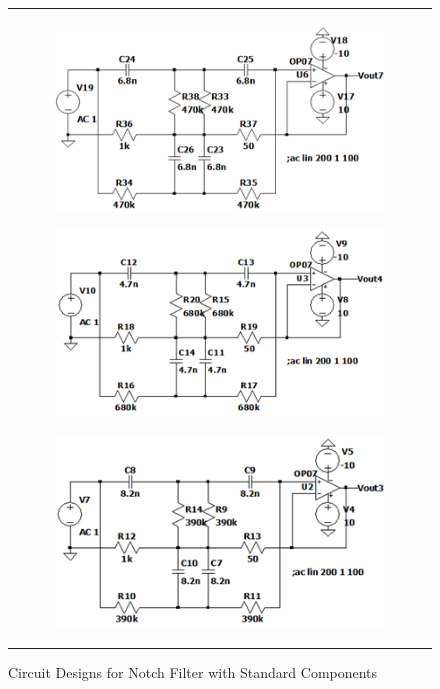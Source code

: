 \documentclass[hidelinks,12pt]{article}
\begin{document}
	\begin{figure}[!h]
		\centering
			\begin{tabular}{c}
				\begin{subfigure}[t]{0.33\textwidth}
					\centering
					\includegraphics[width=\textwidth]{figures/Notch Filter Design/design_1}
					\caption{}
				\end{subfigure}
				\hfill
				\begin{subfigure}[t]{0.33\textwidth}
					\centering
					\includegraphics[width=\textwidth]{figures/Notch Filter Design/design_2}
					\caption{}
					\label{fig:chosen_circuit}
				\end{subfigure}
				\hfill
				\begin{subfigure}[t]{0.33\textwidth}
					\centering
					\includegraphics[width=\textwidth]{figures/Notch Filter Design/design_3}
					\caption{}
				\end{subfigure}
			\end{tabular}
		\caption{Circuit Designs for Notch Filter with Standard Components}
	\end{figure}
\end{document}
